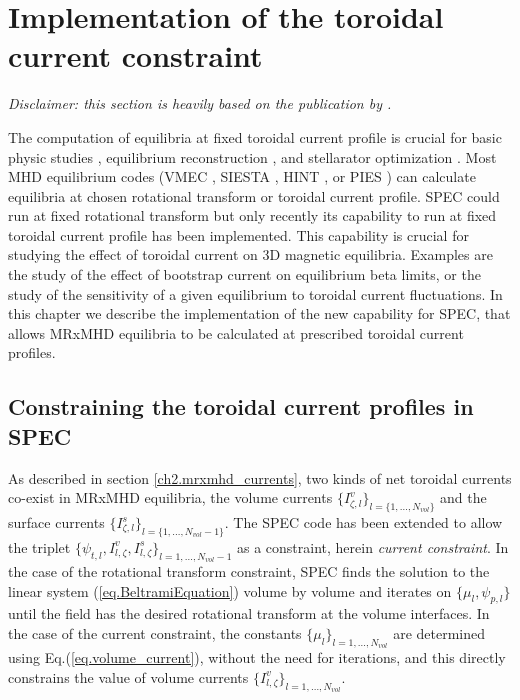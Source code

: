 \documentclass[my_thesis.tex]{subfiles}
\begin{document}
\section{Implementation of the toroidal current constraint \label{sec. current constraint}}

\textit{Disclaimer: this section is heavily based on the publication by \citet{Baillod2021}.}

The computation of equilibria at fixed toroidal current profile is crucial for basic physic studies \citep{Loizu2017,Suzuki2020}, equilibrium reconstruction \citep{Lao1985,Hanson2009}, and stellarator optimization \citep{Geiger2010,Geiger2015}.  Most \ac{MHD} equilibrium codes (VMEC \citep{Hirshman1983,Hirshman1986}, SIESTA \citep{Hirshman2008,Peraza-Rodriguez2017}, HINT \citep{Harafuji1989,Suzuki2006}, or PIES \citep{Reiman1986,Drevlak2005}) can calculate equilibria at chosen rotational transform or toroidal current profile. \ac{SPEC} could run at fixed rotational transform but only recently its capability to run at fixed toroidal current profile has been implemented. This capability is crucial for studying the effect of toroidal current on 3D magnetic equilibria. Examples are the study of the effect of bootstrap current on equilibrium beta limits, or the study of the sensitivity of a given equilibrium to toroidal current fluctuations. In  this  chapter  we describe the implementation of the  new  capability  for  \ac{SPEC}, that allows \ac{MRxMHD} equilibria to be calculated at prescribed toroidal current profiles.


\subsection{Constraining the toroidal current profiles in \ac{SPEC}}

As described in section \ref{ch2.mrxmhd_currents}, two kinds of net toroidal currents co-exist in MRxMHD equilibria, the volume currents $\{I^v_{\zeta,l}\}_{l=\{1,\ldots,N_{vol}\}}$ and the surface currents $\{I^s_{\zeta,l}\}_{l=\{1,\ldots,N_{vol}-1\}}$. The \ac{SPEC} code has been extended to allow the triplet $\{\psi_{t,l}, I^v_{l,\zeta}, I^s_{l,\zeta}\}_{l=1,\ldots,N_{vol}-1}$ as a constraint, herein \textit{current constraint}. In the case of the rotational transform constraint, \ac{SPEC} finds the solution to the linear system (\ref{eq.BeltramiEquation}) volume by volume and iterates on $\{\mu_l, \psi_{p,l}\}$ until the field has the desired rotational transform at the volume interfaces. In the case of the current constraint, the constants $\{\mu_l\}_{l=1,\ldots,N_{vol}}$ are determined using Eq.(\ref{eq.volume_current}), without the need for iterations, and this directly constrains the value of volume currents $\{I^v_{l,\zeta}\}_{l=1,\ldots,N_{vol}}$.
\end{document}
